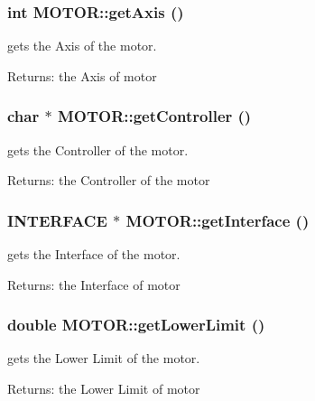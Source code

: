 \subsubsection{\setlength{\rightskip}{0pt plus 5cm}int MOTOR::get\-Axis ()}\label{classMOTOR_9c7140693ab74044f3a458743b254c9a}


gets the Axis of the motor. \begin{Desc}
\item[Returns:]the Axis of motor \end{Desc}
\subsubsection{\setlength{\rightskip}{0pt plus 5cm}char $\ast$ MOTOR::get\-Controller ()}\label{classMOTOR_58d58d8b13822b6c1a4d63d18f60dfad}


gets the Controller of the motor. \begin{Desc}
\item[Returns:]the Controller of the motor \end{Desc}
\subsubsection{\setlength{\rightskip}{0pt plus 5cm}\bf{INTERFACE} $\ast$ MOTOR::get\-Interface ()}\label{classMOTOR_63646bcaf42c111ee603db5ae1ff31ac}


gets the Interface of the motor. \begin{Desc}
\item[Returns:]the Interface of motor \end{Desc}
\subsubsection{\setlength{\rightskip}{0pt plus 5cm}double MOTOR::get\-Lower\-Limit ()}\label{classMOTOR_06fc97df9190fbeed4292e5ab71f9fa2}


gets the Lower Limit of the motor. \begin{Desc}
\item[Returns:]the Lower Limit of motor \end{Desc}
